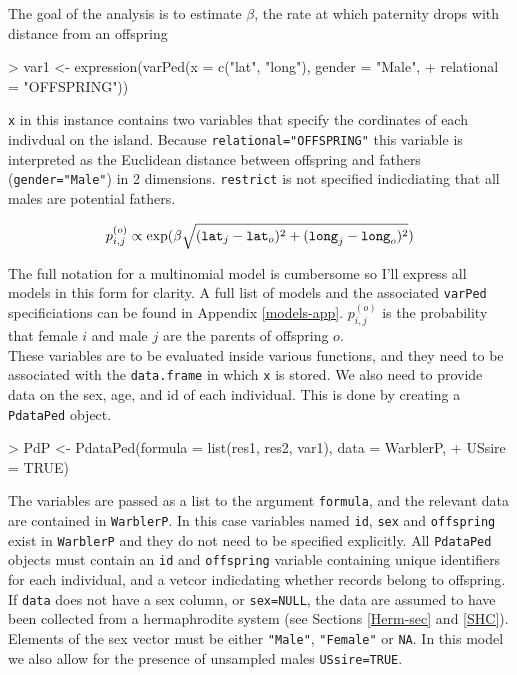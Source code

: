 \documentclass{article}
\begin{document}
The goal of the analysis is to estimate $\beta$, the rate at which paternity drops with distance from an offspring

\begin{Schunk}
\begin{Sinput}
> var1 <- expression(varPed(x = c("lat", "long"), gender = "Male", 
+     relational = "OFFSPRING"))
\end{Sinput}
\end{Schunk}

\texttt{x} in this instance contains two variables that specify the cordinates of each indivdual on the island. Because \texttt{relational="OFFSPRING"} this variable is interpreted as the Euclidean distance between offspring and fathers (\texttt{gender="Male"}) in 2 dimensions.  \texttt{restrict} is not specified indicdiating that all males are potential fathers. 

\begin{equation}
p^{(o)}_{i,j} \propto \textrm{exp}(\beta \sqrt{(\textrm{\texttt{lat}}_{j}-\textrm{\texttt{lat}}_{o})^{2}+(\textrm{\texttt{long}}_{j}-\textrm{\texttt{long}}_{o})^{2}})
\label{dist-eq}
\end{equation}

The full notation for a multinomial model is cumbersome so I'll express all models in this form for clarity. A full list of models and the associated \texttt{varPed} specificiations can be found in Appendix \ref{models-app}. $p^{(o)}_{i,j}$ is the probability that female $i$ and male $j$ are the parents of offspring $o$.\\  

 These variables are to be evaluated inside various functions, and they need to be associated with the \texttt{data.frame} in which \texttt{x} is stored. We also need to provide data on the sex, age, and id of each individual.  This is done by creating a \texttt{PdataPed} object.

\begin{Schunk}
\begin{Sinput}
> PdP <- PdataPed(formula = list(res1, res2, var1), data = WarblerP, 
+     USsire = TRUE)
\end{Sinput}
\end{Schunk}

The variables are passed as a list to the argument \texttt{formula}, and the relevant data are contained in \texttt{WarblerP}.  In this case variables named \texttt{id}, \texttt{sex} and \texttt{offspring} exist in \texttt{WarblerP} and they do not need to be specified explicitly.  All \texttt{PdataPed} objects must contain an \texttt{id} and \texttt{offspring} variable containing unique identifiers for each individual, and a vetcor indicdating whether records belong to offspring. If \texttt{data} does not have a sex column, or \texttt{sex=NULL}, the data are assumed to have been collected from a hermaphrodite system (see Sections \ref{Herm-sec} and \ref{SHC}). Elements of the sex vector must be either \texttt{"Male"}, \texttt{"Female"} or \texttt{NA}.  In this model we also allow for the presence of unsampled males \texttt{USsire=TRUE}.\\
\end{document}

